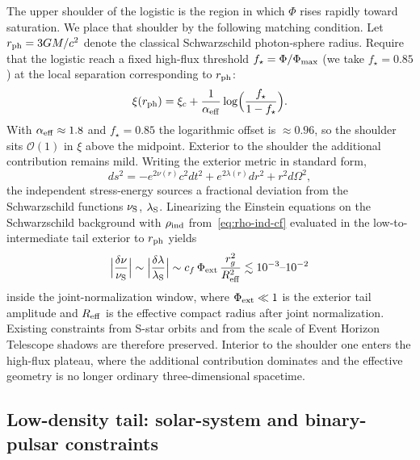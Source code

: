 \documentclass[11pt,a4paper]{article}
\begin{document}
The upper shoulder of the logistic is the region in which \(\Phi\) rises rapidly toward saturation. We place that shoulder by the following matching condition. Let \(r_{\rm ph}=3GM/c^2\) denote the classical Schwarzschild photon-sphere radius. Require that the logistic reach a fixed high-flux threshold \(f_\star=\Phi/\Phi_{\rm max}\) (we take \(f_\star=0.85\)) at the local separation corresponding to \(r_{\rm ph}\):
\begin{equation}
\xi(r_{\rm ph})=\xi_c+\frac{1}{\alpha_{\rm eff}}\log\Bigl(\frac{f_\star}{1-f_\star}\Bigr).
\label{eq:photon-match}
\end{equation}
With \(\alpha_{\rm eff}\approx 1.8\) and \(f_\star=0.85\) the logarithmic offset is \(\approx 0.96\), so the shoulder sits \(\mathcal{O}(1)\) in \(\xi\) above the midpoint. Exterior to the shoulder the additional contribution remains mild. Writing the exterior metric in standard form,
\begin{equation}
ds^2=-e^{2\nu(r)}c^2 dt^2+e^{2\lambda(r)}dr^2+r^2 d\Omega^2,
\label{eq:exterior}
\end{equation}
the independent stress-energy sources a fractional deviation from the Schwarzschild functions \(\nu_{\rm S}\), \(\lambda_{\rm S}\). Linearizing the Einstein equations on the Schwarzschild background with \(\rho_{\rm ind}\) from~\eqref{eq:rho-ind-cf} evaluated in the low-to-intermediate tail exterior to \(r_{\rm ph}\) yields
\begin{equation}
\Bigl|\frac{\delta\nu}{\nu_{\rm S}}\Bigr|
\sim
\Bigl|\frac{\delta\lambda}{\lambda_{\rm S}}\Bigr|
\sim
c_f\,\Phi_{\rm ext}\,\frac{r_g^2}{R_{\rm eff}^2}
\lesssim 10^{-3}\text{--}10^{-2}
\label{eq:metric-dev}
\end{equation}
inside the joint-normalization window, where \(\Phi_{\rm ext}\ll 1\) is the exterior tail amplitude and \(R_{\rm eff}\) is the effective compact radius after joint normalization. Existing constraints from S-star orbits and from the scale of Event Horizon Telescope shadows are therefore preserved. Interior to the shoulder one enters the high-flux plateau, where the additional contribution dominates and the effective geometry is no longer ordinary three-dimensional spacetime.

\subsection{Low-density tail: solar-system and binary-pulsar constraints}
\label{sec:low-density}
\end{document}
